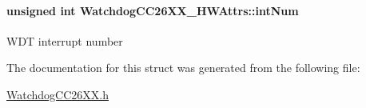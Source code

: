 \paragraph[{int\+Num}]{\setlength{\rightskip}{0pt plus 5cm}unsigned int Watchdog\+C\+C26\+X\+X\+\_\+\+H\+W\+Attrs\+::int\+Num}\label{struct_watchdog_c_c26_x_x___h_w_attrs_af18c0aa9b0cd8354d5f8a3dba21070be}
W\+D\+T interrupt number 

The documentation for this struct was generated from the following file\+:\begin{DoxyCompactItemize}
\item 
\hyperlink{_watchdog_c_c26_x_x_8h}{Watchdog\+C\+C26\+X\+X.\+h}\end{DoxyCompactItemize}
